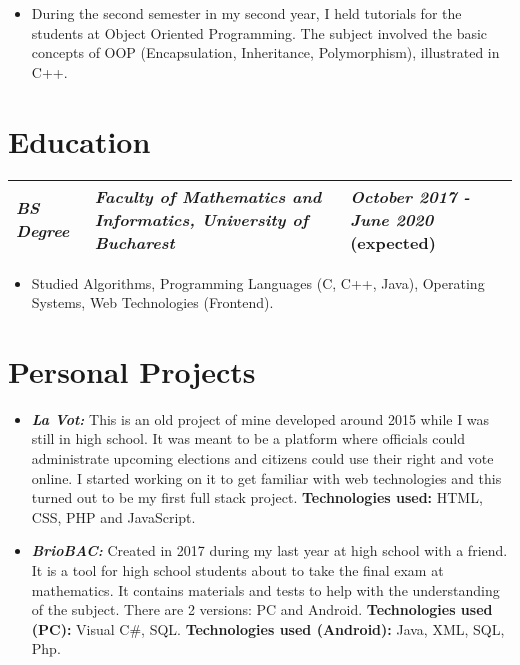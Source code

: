 \documentclass{article}
\begin{document}
        \begin{itemize}
            \item \footnotesize During the second semester in my second year, I held tutorials for the students at Object Oriented Programming. The subject involved the basic concepts of OOP (Encapsulation, Inheritance, Polymorphism), illustrated in C++.
        \end{itemize}

    \section*{Education}
        \begin{tabular} {lC{6cm}L{3cm}}
            \footnotesize\textit{\textbf{BS Degree}} 
            & \footnotesize\textit{\textbf{Faculty of Mathematics and Informatics, University of Bucharest}} 
            & \footnotesize\textit{\textbf{October 2017 - June 2020}} (expected)\\
            \hline
        \end{tabular}

        \begin{itemize}
            \item \footnotesize Studied Algorithms, Programming Languages (C, C++, Java), Operating Systems, Web Technologies (Frontend).
        \end{itemize}

    \section*{Personal Projects}
        \begin{itemize}
            \item \footnotesize \textbf{\textit{La Vot:}} This is an old project of mine developed around 2015 while I was still in high school. It was meant to be a platform where officials could administrate upcoming elections and citizens could use their right and vote online. I started working on it to get familiar with web technologies and this turned out to be my first full stack project. \textbf{Technologies used:} HTML, CSS, PHP and JavaScript.
            \item \textbf{\textit{BrioBAC:}} Created in 2017 during my last year at high school with a friend. It is a tool for high school students about to take the final exam at mathematics. It contains materials and tests to help with the understanding of the subject. There are 2 versions: PC and Android. \textbf{Technologies used (PC):} Visual C\#, SQL. \textbf{Technologies used (Android):} Java, XML, SQL, Php.
        \end{itemize}
\end{document}
